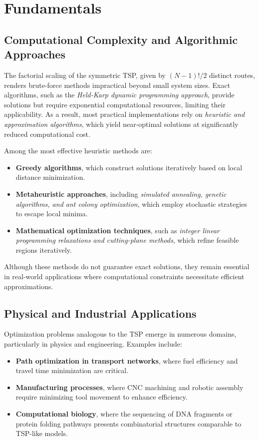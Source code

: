 \section{Fundamentals}






\subsection{Computational Complexity and Algorithmic Approaches}
The factorial scaling of the symmetric TSP, given by $(N-1)!/2$ distinct routes, renders brute-force methods impractical beyond small system sizes. 
Exact algorithms, such as the \textit{Held-Karp dynamic programming approach}, provide solutions but require exponential computational resources, limiting their applicability. 
As a result, most practical implementations rely on \textit{heuristic and approximation algorithms}, which yield near-optimal solutions at significantly reduced computational cost.

Among the most effective heuristic methods are:

\begin{itemize}
    \item \textbf{Greedy algorithms}, which construct solutions iteratively based on local distance minimization.
    \item \textbf{Metaheuristic approaches}, including \textit{simulated annealing, genetic algorithms, and ant colony optimization}, which employ stochastic strategies to escape local minima.
    \item \textbf{Mathematical optimization techniques}, such as \textit{integer linear programming relaxations and cutting-plane methods}, which refine feasible regions iteratively.
\end{itemize}

Although these methods do not guarantee exact solutions, they remain essential in real-world applications where computational constraints necessitate efficient approximations.

\subsection{Physical and Industrial Applications}
Optimization problems analogous to the TSP emerge in numerous domains, particularly in physics and engineering. Examples include:

\begin{itemize}
    \item \textbf{Path optimization in transport networks}, where fuel efficiency and travel time minimization are critical.
    \item \textbf{Manufacturing processes}, where CNC machining and robotic assembly require minimizing tool movement to enhance efficiency.
    \item \textbf{Computational biology}, where the sequencing of DNA fragments or protein folding pathways presents combinatorial structures comparable to TSP-like models.
\end{itemize}

